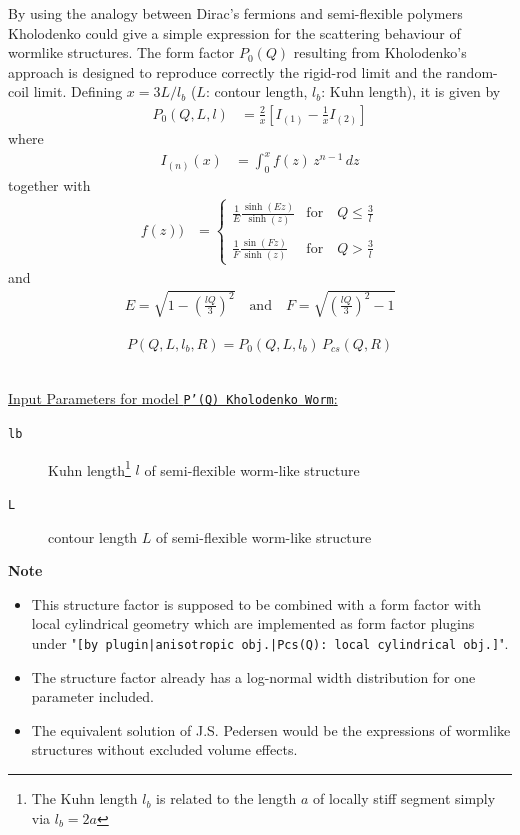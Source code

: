 By using the analogy between Dirac's fermions
and semi-flexible polymers
Kholodenko \cite{kholodenko93} could give a simple expression for the
scattering behaviour of wormlike structures. The form factor $P_0(Q)$ resulting
from Kholodenko's approach is designed to reproduce
correctly the rigid-rod limit and the random-coil limit.
Defining $x = 3L/l_b$ ($L$: contour length, $l_b$: Kuhn length), it is given by
\begin{align}
P_0(Q,L,l) &= \frac{2}{x} \left[I_{(1)} -\frac{1}{x}I_{(2)}\right]
\label{eq:KholodenkoPprime}
\end{align}
where
\begin{align}
I_{(n)}(x) &= \int_0^x  f(z) \, z^{n-1} \, dz
\end{align}
together with
\begin{align}
f(z)) &=
\begin{cases} \displaystyle
\frac{1}{E}\frac{\sinh(Ez)}{\sinh(z)} & \text{for} \quad \displaystyle Q \leq \frac{3}{l}\\ \\
\displaystyle
\frac{1}{F}\frac{\sin(Fz)}{\sinh(z)} & \text{for} \quad \displaystyle Q > \frac{3}{l}
\end{cases}
\end{align}
and
\begin{align}
E = \sqrt{1-\left(\frac{lQ}{3}\right)^2} \quad \text{and} \quad F = \sqrt{\left(\frac{lQ}{3}\right)^2-1}
\end{align}

\begin{align}
P(Q,L,l_b,R) = P_0(Q,L,l_b)\, P_{cs}(Q,R)
\end{align}

\vspace{5mm}

\hspace{1pt}\\
\underline{Input Parameters for model \texttt{P'(Q) Kholodenko Worm}:}\\
\begin{description}
\item[\texttt{lb}] Kuhn length\footnote{The Kuhn length $l_b$ is related to the length $a$ of
    locally stiff segment simply via $l_b=2a$} $l$ of semi-flexible worm-like structure
\item[\texttt{L}] contour length $L$ of semi-flexible worm-like structure
\end{description}

\noindent
\textbf{Note}
\begin{itemize}
  \item This structure factor is supposed to be combined with a form factor with local cylindrical geometry which are implemented as form factor plugins
under "\texttt{[by plugin|anisotropic obj.|Pcs(Q): local cylindrical obj.]}".
\item The structure factor already has a log-normal width distribution for one parameter included.
\item The equivalent solution of J.S. Pedersen \cite{Pedersen96Macrom} would be the expressions of wormlike structures without excluded volume effects.
\end{itemize}

